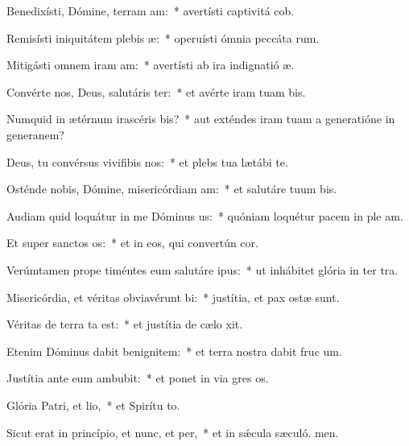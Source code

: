 \item Benedixísti, Dómine, terram am:~* avertísti captivitá cob.
\item Remisísti iniquitátem plebis æ:~* operuísti ómnia peccáta rum.
\item Mitigásti omnem iram am:~* avertísti ab ira indignatió æ.
\item Convérte nos, Deus, salutáris ter:~* et avérte iram tuam  bis.
\item Numquid in ætérnum irascéris bis?~* aut exténdes iram tuam a generatióne in generanem?
\item Deus, tu convérsus vivifibis nos:~* et plebs tua lætábi  te.
\item Osténde nobis, Dómine, misericórdiam am:~* et salutáre tuum  bis.
\item Audiam quid loquátur in me Dóminus us:~* quóniam loquétur pacem in ple am.
\item Et super sanctos os:~* et in eos, qui convertún  cor.
\item Verúmtamen prope timéntes eum salutáre ipus:~* ut inhábitet glória in ter tra.
\item Misericórdia, et véritas obviavérunt bi:~* justítia, et pax ostæ sunt.
\item Véritas de terra ta est:~* et justítia de cælo xit.
\item Etenim Dóminus dabit benignitem:~* et terra nostra dabit fruc um.
\item Justítia ante eum ambubit:~* et ponet in via gres os.
\item Glória Patri, et lio,~* et Spirítu to.
\item Sicut erat in princípio, et nunc, et per,~* et in sǽcula sæculó. men.
